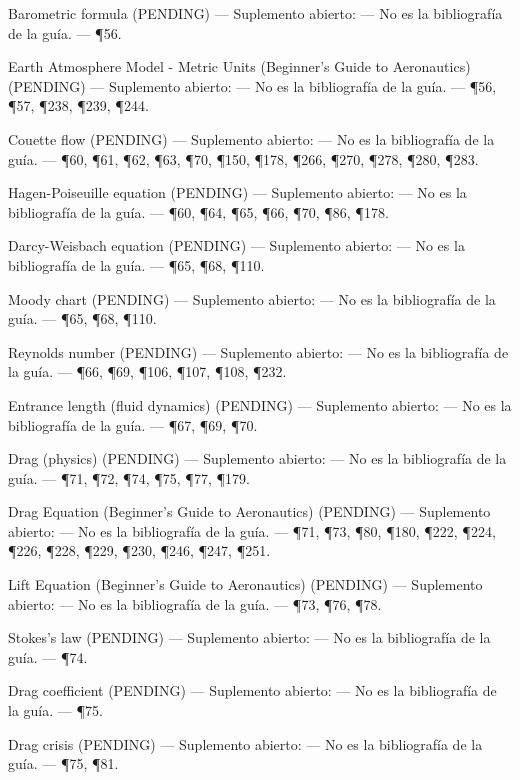 \documentclass[10pt,openany]{book}
\begin{document}
\noindent Barometric formula (PENDING) --- Suplemento abierto: --- No es la bibliografía de la guía. --- \P56.\par
\noindent Earth Atmosphere Model - Metric Units (Beginner's Guide to Aeronautics) (PENDING) --- Suplemento abierto: --- No es la bibliografía de la guía. --- \P56, \P57, \P238, \P239, \P244.\par
\noindent Couette flow (PENDING) --- Suplemento abierto: --- No es la bibliografía de la guía. --- \P60, \P61, \P62, \P63, \P70, \P150, \P178, \P266, \P270, \P278, \P280, \P283.\par
\noindent Hagen-Poiseuille equation (PENDING) --- Suplemento abierto: --- No es la bibliografía de la guía. --- \P60, \P64, \P65, \P66, \P70, \P86, \P178.\par
\noindent Darcy-Weisbach equation (PENDING) --- Suplemento abierto: --- No es la bibliografía de la guía. --- \P65, \P68, \P110.\par
\noindent Moody chart (PENDING) --- Suplemento abierto: --- No es la bibliografía de la guía. --- \P65, \P68, \P110.\par
\noindent Reynolds number (PENDING) --- Suplemento abierto: --- No es la bibliografía de la guía. --- \P66, \P69, \P106, \P107, \P108, \P232.\par
\noindent Entrance length (fluid dynamics) (PENDING) --- Suplemento abierto: --- No es la bibliografía de la guía. --- \P67, \P69, \P70.\par
\noindent Drag (physics) (PENDING) --- Suplemento abierto: --- No es la bibliografía de la guía. --- \P71, \P72, \P74, \P75, \P77, \P179.\par
\noindent Drag Equation (Beginner's Guide to Aeronautics) (PENDING) --- Suplemento abierto: --- No es la bibliografía de la guía. --- \P71, \P73, \P80, \P180, \P222, \P224, \P226, \P228, \P229, \P230, \P246, \P247, \P251.\par
\noindent Lift Equation (Beginner's Guide to Aeronautics) (PENDING) --- Suplemento abierto: --- No es la bibliografía de la guía. --- \P73, \P76, \P78.\par
\noindent Stokes's law (PENDING) --- Suplemento abierto: --- No es la bibliografía de la guía. --- \P74.\par
\noindent Drag coefficient (PENDING) --- Suplemento abierto: --- No es la bibliografía de la guía. --- \P75.\par
\noindent Drag crisis (PENDING) --- Suplemento abierto: --- No es la bibliografía de la guía. --- \P75, \P81.\par
\end{document}
